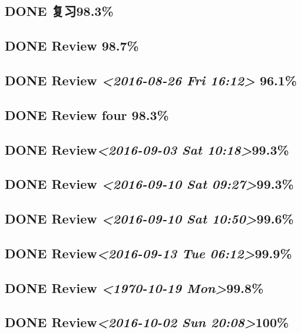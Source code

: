 \documentclass[11pt]{ctexart}
\begin{document}
\subsection{{\bfseries\sffamily DONE} 复习98.3\%}
\label{sec:orga0e1002}
\subsection{{\bfseries\sffamily DONE} Review 98.7\%}
\label{sec:org508eb73}
\subsection{{\bfseries\sffamily DONE} Review \textit{<2016-08-26 Fri 16:12> } 96.1\%}
\label{sec:org47629a8}
\subsection{{\bfseries\sffamily DONE} Review four 98.3\%}
\label{sec:org278ab30}

\subsection{{\bfseries\sffamily DONE} Review\textit{<2016-09-03 Sat 10:18>}99.3\%}
\label{sec:orge7316f9}
\subsection{{\bfseries\sffamily DONE} Review \textit{<2016-09-10 Sat 09:27>}99.3\%}
\label{sec:orgd2c6bba}
\subsection{{\bfseries\sffamily DONE} Review \textit{<2016-09-10 Sat 10:50>}99.6\%}
\label{sec:org5f44267}
\subsection{{\bfseries\sffamily DONE} Review\textit{<2016-09-13 Tue 06:12>}99.9\%}
\label{sec:org12d7c4c}
\subsection{{\bfseries\sffamily DONE} Review \textit{<1970-10-19 Mon>}99.8\%}
\label{sec:org5efe770}
\subsection{{\bfseries\sffamily DONE} Review\textit{<2016-10-02 Sun 20:08>}100\%}
\label{sec:org24e9dd6}
\end{document}

